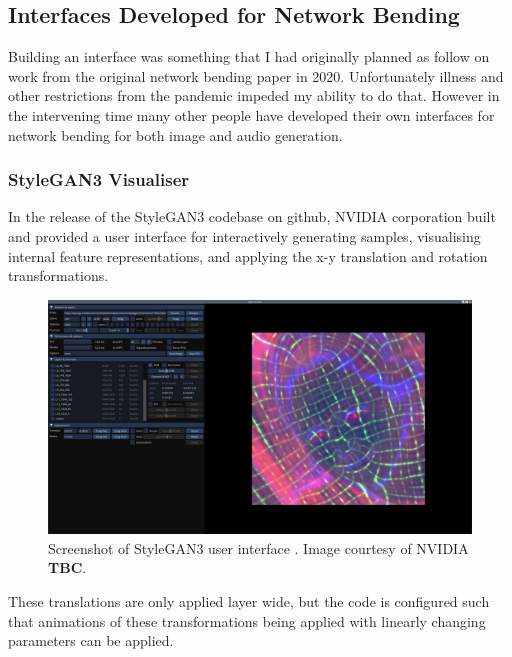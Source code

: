 \subsection{Interfaces Developed for Network Bending}
\label{c7:subsec:net-bend-interfaces}

Building an interface was something that I had originally planned as follow on work from the original network bending paper in 2020. 
Unfortunately illness and other restrictions from the pandemic impeded my ability to do that. 
However in the intervening time many other people have developed their own interfaces for network bending for both image and audio generation.

\subsubsection{StyleGAN3 Visualiser}

In the release of the StyleGAN3 codebase on github, NVIDIA corporation built and provided a user interface for interactively generating samples, visualising internal feature representations, and applying the x-y translation and rotation transformations. 

\begin{figure}[!htb]
    \centering
    \captionsetup{justification=centering}
    \includegraphics[width=1\textwidth]{figures/c7_impact/net-bend-technical/stylegan3-vis-interface.png}
    \caption[StyleGAN3 user interface]{Screenshot of StyleGAN3 user interface \citep{karras2021alias}. Image courtesy of NVIDIA \textbf{TBC}.}
    \label{fig:c7:stylegan3-interface}
\end{figure}


These translations are only applied layer wide, but the code is configured such that animations of these transformations being applied with linearly changing parameters can be applied. 

